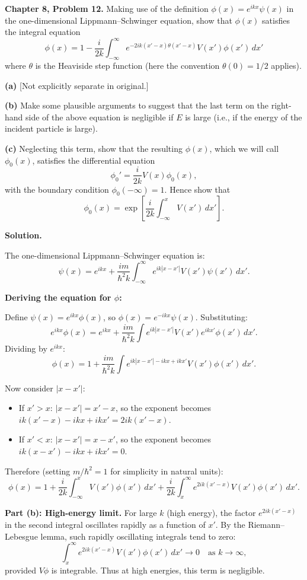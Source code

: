 \documentclass[12pt]{article}
\begin{document}
\textbf{Chapter 8, Problem 12.} Making use of the definition $\phi(x) = e^{ikx}\psi(x)$ in the one-dimensional Lippmann--Schwinger equation, show that $\phi(x)$ satisfies the integral equation
\[
\phi(x) = 1 - \frac{i}{2k}\int_{-\infty}^{\infty} e^{-2ik(x'-x)\theta(x'-x)}V(x')\phi(x')\,dx'
\]
where $\theta$ is the Heaviside step function (here the convention $\theta(0) = 1/2$ applies).

\textbf{(a)} [Not explicitly separate in original.]

\textbf{(b)} Make some plausible arguments to suggest that the last term on the right-hand side of the above equation is negligible if $E$ is large (i.e., if the energy of the incident particle is large).

\textbf{(c)} Neglecting this term, show that the resulting $\phi(x)$, which we will call $\phi_0(x)$, satisfies the differential equation
\[
\phi_0' = \frac{i}{2k}V(x)\phi_0(x),
\]
with the boundary condition $\phi_0(-\infty) = 1$. Hence show that
\[
\phi_0(x) = \exp\left[\frac{i}{2k}\int_{-\infty}^{x}V(x')\,dx'\right].
\]

\bigskip
\textbf{Solution.}

The one-dimensional Lippmann--Schwinger equation is:
\[
\psi(x) = e^{ikx} + \frac{im}{\hbar^2 k}\int_{-\infty}^{\infty} e^{ik|x-x'|}V(x')\psi(x')\,dx'.
\]

\textbf{Deriving the equation for $\phi$:}

Define $\psi(x) = e^{ikx}\phi(x)$, so $\phi(x) = e^{-ikx}\psi(x)$. Substituting:
\[
e^{ikx}\phi(x) = e^{ikx} + \frac{im}{\hbar^2 k}\int e^{ik|x-x'|}V(x')e^{ikx'}\phi(x')\,dx'.
\]
Dividing by $e^{ikx}$:
\[
\phi(x) = 1 + \frac{im}{\hbar^2 k}\int e^{ik|x-x'|-ikx+ikx'}V(x')\phi(x')\,dx'.
\]

Now consider $|x-x'|$:
\begin{itemize}
\item If $x'>x$: $|x-x'| = x'-x$, so the exponent becomes $ik(x'-x)-ikx+ikx' = 2ik(x'-x)$.
\item If $x'<x$: $|x-x'| = x-x'$, so the exponent becomes $ik(x-x')-ikx+ikx' = 0$.
\end{itemize}

Therefore (setting $m/\hbar^2 = 1$ for simplicity in natural units):
\[
\phi(x) = 1 + \frac{i}{2k}\int_{-\infty}^{x} V(x')\phi(x')\,dx' + \frac{i}{2k}\int_{x}^{\infty} e^{2ik(x'-x)}V(x')\phi(x')\,dx'.
\]

\textbf{Part (b): High-energy limit.}
For large $k$ (high energy), the factor $e^{2ik(x'-x)}$ in the second integral oscillates rapidly as a function of $x'$. By the Riemann--Lebesgue lemma, such rapidly oscillating integrals tend to zero:
\[
\int_x^\infty e^{2ik(x'-x)}V(x')\phi(x')\,dx' \to 0 \quad\text{as }k\to\infty,
\]
provided $V\phi$ is integrable. Thus at high energies, this term is negligible.
\end{document}
